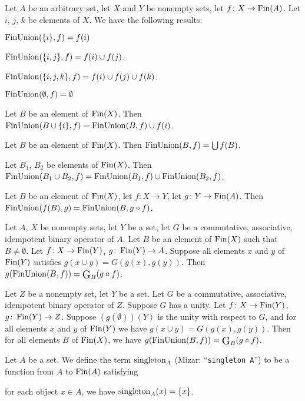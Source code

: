 \documentclass{article}
\begin{document}
Let $A$ be an arbitrary set, let $X$ and $Y$ be nonempty sets, let
$f\colon X\to\operatorname{Fin}(A)$. Let $i$, $j$, $k$ be elements of $X$. We have the
following results:
\begin{thm}
\item\label{setwiseo:44} $\operatorname{FinUnion}(\{i\},f)=f(i)$
\item\label{setwiseo:45} $\operatorname{FinUnion}(\{i,j\},f)=f(i)\cup f(j)$.
\item\label{setwiseo:46} $\operatorname{FinUnion}(\{i,j,k\},f)=f(i)\cup f(j)\cup f(k)$.
\item\label{setwiseo:47} $\operatorname{FinUnion}(\emptyset,f)=\emptyset$
\item\label{setwiseo:48} Let $B$ be an element of $\operatorname{Fin}(X)$.
  Then $\operatorname{FinUnion}(B\cup\{i\},f)=\operatorname{FinUnion}(B,f)\cup f(i)$.
\item\label{setwiseo:49} Let $B$ be an element of $\operatorname{Fin}(X)$.
  Then $\operatorname{FinUnion}(B,f)=\bigcup f(B)$.
\item\label{setwiseo:50} Let $B_{1}$, $B_{2}$ be elements of $\operatorname{Fin}(X)$.
  Then $\operatorname{FinUnion}(B_{1}\cup B_{2},f)=\operatorname{FinUnion}(B_{1},f)\cup \operatorname{FinUnion}(B_{2},f)$.
\item\label{setwiseo:51} Let $B$ be an element of $\operatorname{Fin}(X)$, let
  $f\colon X\to Y$, let $g\colon Y\to\operatorname{Fin}(A)$.
  Then $\operatorname{FinUnion}(f(B),g)=\operatorname{FinUnion}(B,g\circ f)$.
\item\label{setwiseo:52} Let $A$, $X$ be nonempty sets, let $Y$ be a
  set, let $G$ be a commutative, associative, idempotent binary operator
  of $A$. Let $B$ be an element of $\operatorname{Fin}(X)$ such that $B\neq\emptyset$.
  Let $f\colon X\to\operatorname{Fin}(Y)$, $g\colon\operatorname{Fin}(Y)\to A$.
  Suppose all elements $x$ and $y$ of $\operatorname{Fin}(Y)$ satisfies $g(x\cup y)=G(g(x),g(y))$.
  Then $g(\FinUnion(B,f))=\iteratedBinop{G}_{B}(g\circ f)$.
\item\label{setwiseo:53} Let $Z$ be a nonempty set, let $Y$ be a set.
  Let $G$ be a commutative, associative, idempotent binary operator of $Z$.
  Suppose $G$ has a unity.
  Let $f\colon X\to\operatorname{Fin}(Y)$, $g\colon\operatorname{Fin}(Y)\to Z$.
  Suppose $(g(\emptyset))(Y)$ is the unity with respect to $G$, and for
  all elements $x$ and $y$ of $\operatorname{Fin}(Y)$ we have $g(x\cup y)=G(g(x),g(y))$.
  Then for all elements $B$ of $\operatorname{Fin}(X)$, we have
  $g(\FinUnion(B,f))=\iteratedBinop{G}_{B}(g\circ f)$.
\end{thm}

\begin{definition}
Let $A$ be a set.
We define the term $\operatorname{singleton}_{A}$ (Mizar: ``\verb#singleton A#'') to be a function from $A$ to $\operatorname{Fin}(A)$
satisfying
\begin{defn}
\item for each object $x\in A$, we have $\operatorname{singleton}_{A}(x)=\{x\}$.
\end{defn}
\end{definition}
\end{document}
